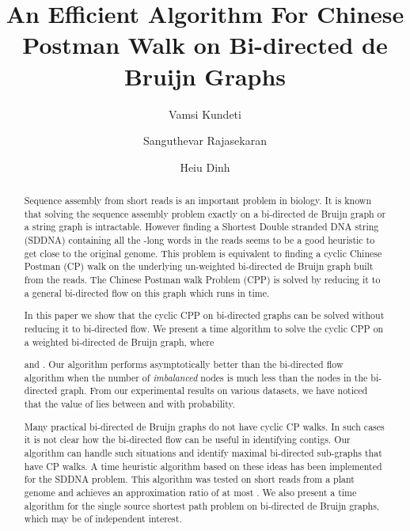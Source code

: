 \documentclass[runningheads]{llncs}
\begin{document}
\title{An Efficient Algorithm For Chinese Postman Walk on Bi-directed de Bruijn Graphs} 


\author{Vamsi Kundeti \and Sanguthevar Rajasekaran \and Heiu Dinh}
 \maketitle

\begin{abstract}
Sequence assembly from short reads is an important problem in biology. It is known that solving the sequence assembly problem exactly on a bi-directed de Bruijn
graph or a string graph is intractable. 
However finding a Shortest Double stranded DNA string (SDDNA) containing all the -long 
words in the reads seems to be a good heuristic to get close to the original genome. This problem is equivalent to finding a cyclic Chinese Postman (CP) walk on the underlying un-weighted 
bi-directed de Bruijn graph built from the reads. The Chinese Postman walk Problem (CPP) is solved by reducing it to a general bi-directed flow on this graph which runs in  time.  

\vspace{0.1in}

In this paper we show that the cyclic CPP on bi-directed graphs can be solved without reducing
it to bi-directed flow. We present a  time
algorithm to solve the cyclic CPP on a weighted bi-directed de Bruijn graph, where 

and . Our algorithm performs asymptotically
better than the bi-directed flow algorithm when the number of {\em imbalanced} nodes 
 is much less than the nodes in the bi-directed graph. From our experimental
results on various datasets, we have noticed that the value of  lies between  and  with  probability.

\vspace{0.1in}

Many practical bi-directed de Bruijn graphs do not have cyclic CP walks. In such cases
it is not clear how the bi-directed flow can be useful in identifying contigs. Our
algorithm can handle such situations and identify maximal bi-directed sub-graphs
that have CP walks. A  time heuristic algorithm based on these ideas
has been implemented for the SDDNA problem. This algorithm was tested on short reads
from a plant genome and achieves an approximation ratio of at most . We also present a  time algorithm for the single 
source shortest path problem on bi-directed de Bruijn graphs, which may be of 
independent interest. 
\end{abstract}
\end{document}
